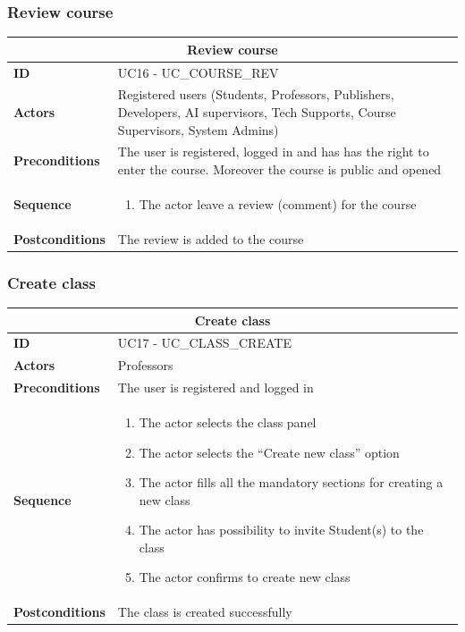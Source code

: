 \subsubsection{Review course}
\begin{tabular}{|m{2.5cm}|m{8cm}|}
	\hline
	\multicolumn{2}{|c|}{Review course} \\
	\hline
	\textbf{ID} & UC16 - UC\_COURSE\_REV \\
	\hline
	\textbf{Actors} & Registered users (Students, Professors, Publishers, Developers, AI supervisors, Tech Supports, Course Supervisors, System Admins) \\
	\hline
	\textbf{Preconditions} & The user is registered, logged in and has has the right to enter the course. Moreover the course is public and opened\\
	\hline
	\textbf{Sequence} & 
	\begin{enumerate}
		\item The actor leave a review (comment) for the course
	\end{enumerate} \\
	\hline
	\textbf{Postconditions} & The review is added to the course \\
	\hline
\end{tabular}

\subsubsection{Create class}
\begin{tabular}{|m{2.5cm}|m{8cm}|}
	\hline
	\multicolumn{2}{|c|}{Create class} \\
	\hline
	\textbf{ID} & UC17 - UC\_CLASS\_CREATE \\
	\hline
	\textbf{Actors} & Professors \\
	\hline
	\textbf{Preconditions} & The user is registered and logged in \\
	\hline
	\textbf{Sequence} & 
	\begin{enumerate}
		\item The actor selects the class panel
		\item The actor selects the “Create new class” option
		\item The actor fills all the mandatory sections for creating a new class
		\item The actor has possibility to invite Student(s) to the class
		\item The actor confirms to create new class
	\end{enumerate} \\
	\hline
	\textbf{Postconditions} & The class is created successfully \\
	\hline
\end{tabular}

